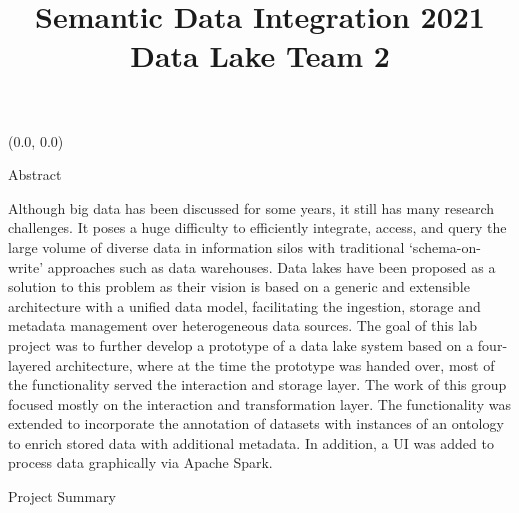 \documentclass[12pt]{beamer}
\title{Semantic Data Integration 2021 \\ Data Lake Team 2}
\author{\hspace{0.5em}{\vphantom{Wy}Abdullah Zaid, Maher Fallou, Tobias Claas, Muhammad Noman, Sayed Hoseini \\ Supervised by Prof. Dr. Quix and Dr. Lange-Bever}} %
\begin{document}
	\begin{textblock}{0.5}(0.0, 0.0)
		
		\begin{block}{Abstract}
			
			\item Although big data has been discussed for some years, it still has many research challenges. It poses a huge difficulty to efficiently integrate, access, and query the large volume of diverse data in information silos with traditional ‘schema-on-write’ approaches such as data warehouses. Data lakes have been proposed as a solution to this problem as their vision is based on a generic and extensible architecture with a unified data model, facilitating the ingestion, storage and metadata management over heterogeneous data sources. The goal of this lab project was to further develop a prototype of a data lake system based on a four-layered architecture, where at the time the prototype was handed over, most of the functionality served the interaction and storage layer. The work of this group focused mostly on the interaction and transformation layer. The functionality was extended to incorporate the annotation of datasets with instances of an ontology to enrich stored data with additional metadata. In addition, a UI was added to process data graphically via Apache Spark.
		\end{block}
		
		\begin{block}{Project Summary}
			

\end{block}
\end{textblock}
\end{document}
